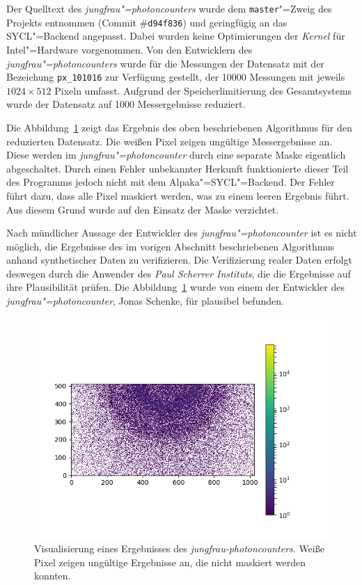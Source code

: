 Der Quelltext des \textit{jungfrau"=photoncounters} wurde dem
\texttt{master}"=Zweig des Projekts entnommen (Commit \#\texttt{d94f836}) und
geringfügig an das SYCL"=Backend angepasst. Dabei wurden keine Optimierungen der
\textit{Kernel} für Intel"=Hardware vorgenommen. Von den Entwicklern des
\textit{jungfrau"=photoncounters} wurde für die Messungen der Datensatz mit der
Bezeichung \texttt{px\_101016} zur Verfügung gestellt, der \num{10000}
Messungen mit jeweils $1024 \times 512$ Pixeln umfasst. Aufgrund der
Speicherlimitierung des Gesamtsystems wurde der Datensatz auf \num{1000}
Messergebnisse reduziert.

Die Abbildung~\ref{ergebnisse:verifizierung:performanz:photonen} zeigt das
Ergebnis des oben beschriebenen Algorithmus für den reduzierten Datensatz. Die
weißen Pixel zeigen ungültige Messergebnisse an. Diese werden im
\textit{jungfrau"=photoncounter} durch eine separate Maske eigentlich
abgeschaltet. Durch einen Fehler unbekannter Herkunft funktionierte dieser Teil
des Programms jedoch nicht mit dem Alpaka"=SYCL"=Backend. Der Fehler führt dazu,
dass alle Pixel maskiert werden, was zu einem leeren Ergebnis führt. Aus diesem
Grund wurde auf den Einsatz der Maske verzichtet.

Nach mündlicher Aussage der Entwickler des \textit{jungfrau"=photoncounter} ist
es nicht möglich, die Ergebnisse des im vorigen Abschnitt beschriebenen
Algorithmus anhand synthetischer Daten zu verifizieren. Die Verifizierung realer
Daten erfolgt deswegen durch die Anwender des \textit{Paul Scherrer Instituts},
die die Ergebnisse auf ihre Plausibilität prüfen. Die
Abbildung~\ref{ergebnisse:verifizierung:performanz:photonen} wurde von einem der
Entwickler des \textit{jungfrau"=photoncounter}, Jonas Schenke, für plausibel
befunden.

\begin{figure}
    \centering
    \includegraphics{log/photon.png}
    \caption[Visualisierung eines Ergebnisses des
             \textit{jungfrau-photoncounters}]{Visualisierung eines Ergebnisses
             des \textit{jungfrau-photoncounters}. Weiße Pixel zeigen
             ungültige Ergebnisse an, die nicht maskiert werden konnten.}
    \label{ergebnisse:verifizierung:performanz:photonen}
\end{figure}


